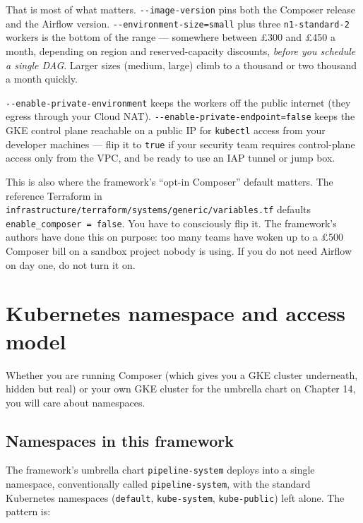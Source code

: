 \documentclass[
  11pt,
  british,
  oneside]{book}
\begin{document}
That is most of what matters. \texttt{-\/-image-version} pins both the
Composer release and the Airflow version.
\texttt{-\/-environment-size=small} plus three \texttt{n1-standard-2}
workers is the bottom of the range --- somewhere between £300 and £450 a
month, depending on region and reserved-capacity discounts, \emph{before
you schedule a single DAG}. Larger sizes (medium, large) climb to a
thousand or two thousand a month quickly.

\texttt{-\/-enable-private-environment} keeps the workers off the public
internet (they egress through your Cloud NAT).
\texttt{-\/-enable-private-endpoint=false} keeps the GKE control plane
reachable on a public IP for \texttt{kubectl} access from your developer
machines --- flip it to \texttt{true} if your security team requires
control-plane access only from the VPC, and be ready to use an IAP
tunnel or jump box.

This is also where the framework's ``opt-in Composer'' default matters.
The reference Terraform in
\texttt{infrastructure/terraform/systems/generic/variables.tf} defaults
\texttt{enable\_composer\ =\ false}. You have to consciously flip it.
The framework's authors have done this on purpose: too many teams have
woken up to a £500 Composer bill on a sandbox project nobody is using.
If you do not need Airflow on day one, do not turn it on.

\hypertarget{kubernetes-namespace-and-access-model}{%
\section{Kubernetes namespace and access
model}\label{kubernetes-namespace-and-access-model}}

Whether you are running Composer (which gives you a GKE cluster
underneath, hidden but real) or your own GKE cluster for the umbrella
chart on Chapter 14, you will care about namespaces.

\hypertarget{namespaces-in-this-framework}{%
\subsection{Namespaces in this
framework}\label{namespaces-in-this-framework}}

The framework's umbrella chart \texttt{pipeline-system} deploys into a
single namespace, conventionally called \texttt{pipeline-system}, with
the standard Kubernetes namespaces (\texttt{default},
\texttt{kube-system}, \texttt{kube-public}) left alone. The pattern is:
\end{document}
